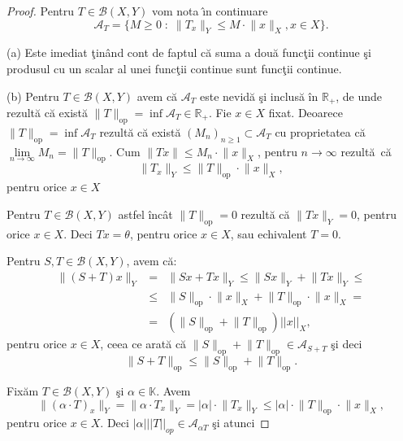 \documentclass[ a4paper, 12pt]{report}
\theoremstyle{definition}
\theoremstyle{remark}
\numberwithin{equation}{section}
\begin{document}
\begin{proof}
Pentru $T \in \mathcal{B}(X,Y) $ vom nota \^\i n continuare
$$\mathcal{A}_T = \{M \geq 0 \; : \; \lVert  T_x \rVert_{Y} \leq M \cdot \lVert x \rVert_{X},x \in X\}.$$

(a) Este imediat \c tin\^ and cont de faptul c\u a suma a dou\u a func\c tii continue \c si produsul cu un scalar al unei func\c tii continue sunt func\c tii continue.

(b) Pentru $T \in \mathcal{B}(X,Y)$ avem c\u a $\mathcal{A}_T$ este nevid\u a \c si inclus\u a \^in $\mathbb{R}_{+}$, de unde rezult\u a c\u a exist\u a
$\lVert T \rVert_{\mbox{op}} = \inf \mathcal{A}_T \in \mathbb{R}_{+}$.
Fie $x \in X$ fixat.
Deoarece $\lVert T \rVert_{\mbox{op}} = \inf\mathcal{A}_T$ rezult\u a c\u a exist\u a $(M_n)_{n \geq 1} \subset \mathcal{A}_{T}$ cu proprietatea c\u a $\lim\limits_{n \rightarrow \infty} M_n = \lVert T \rVert_{\mbox{op}}$. Cum $\lVert Tx \rVert \leq M_n \cdot \lVert x\rVert_{X}$, pentru $n \longrightarrow \infty$ rezult\u a\  c\u a
$$\lVert T_x \rVert_{Y} \leq \lVert T \rVert_{\mbox{op}} \cdot \lVert x  \rVert_{X},$$ pentru orice $x \in X$

Pentru $T \in \mathcal{B}(X,Y)$ astfel \^inc\^at $\lVert T \rVert_{\mbox{op}} = 0$ rezult\u a c\u a $\lVert Tx \rVert_{Y} = 0$, pentru orice $x \in X$. Deci $Tx = \theta$, pentru orice $x \in X$, sau echivalent $T = 0$.

Pentru $S, T \in \mathcal{B}(X,Y)$, avem c\u a:
\begin{eqnarray*}
\lVert (S+T){x} \rVert_{Y} &=& \lVert S{x}+T{x}  \rVert_{Y} \leq \lVert Sx \rVert_{Y} + \lVert Tx \rVert_{Y} \leq\\
&\leq& \lVert S  \rVert_{\mbox{op}} \cdot \lVert x \rVert_{X} + \lVert T \rVert_{\mbox{op}} \cdot \lVert x  \rVert_{X} =\\
&=& (\lVert S \rVert_{\mbox{op}} + \lVert T \rVert_{\mbox{op}})||x||_X,
\end{eqnarray*}
pentru orice $x \in X$, ceea ce arat\u a c\u a $\lVert S \rVert_{\mbox{op}} + \lVert T \rVert_{\mbox{op}} \in \mathcal{A}_{S+T}$ \c si deci
$$\lVert S+T  \rVert_{\mbox{op}} \leq \lVert S \rVert_{\mbox{op}} + \lVert T \rVert_{\mbox{op}}.$$

Fix\u am $T \in \mathcal{B}(X,Y)$ \c si  $\alpha \in \mathbb{K}.$ Avem
$$\lVert (\alpha \cdot T )_x\rVert_{Y} = \lVert \alpha \cdot T_x  \rVert_{Y} = \lvert \alpha \rvert \cdot \lVert T_x \rVert_{Y} \leq \lvert \alpha \rvert \cdot \lVert T \rVert_{\mbox{op}} \cdot \lVert x \rVert_{X},$$ pentru orice $x \in X$. Deci $|\alpha| ||T||_{op} \in \mathcal{A}_{\alpha T}$ \c si atunci


\end{proof}
\end{document}
